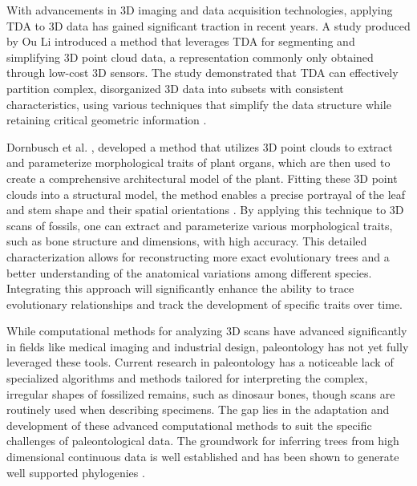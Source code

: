 \documentclass[12pt]{article}
\begin{document}

With advancements in 3D imaging and data acquisition technologies, applying TDA 
to 3D data has gained significant traction in recent years. A study produced by 
Ou Li \citep{li2021} introduced a method that leverages TDA for segmenting and 
simplifying 3D point cloud data, a representation commonly only obtained through 
low-cost 3D sensors. The study demonstrated that TDA can effectively partition 
complex, disorganized 3D data into subsets with consistent characteristics, 
using various techniques that simplify the data structure while retaining 
critical geometric information \citep{li2021}.

Dornbusch et al. \cite{dornbusch2007}, developed a method that utilizes 3D point 
clouds to extract and parameterize morphological traits of plant organs, which 
are then used to create a comprehensive architectural model of the plant. Fitting 
these 3D point clouds into a structural model, the method enables a precise 
portrayal of the leaf and stem shape and their spatial orientations \citep{dornbusch2007}. 
By applying this technique to 3D scans of fossils, one can extract and parameterize 
various morphological traits, such as bone structure and dimensions, with high 
accuracy. This detailed characterization allows for reconstructing more exact
evolutionary trees and a better understanding of the anatomical variations among
different species. Integrating this approach will significantly enhance the
ability to trace evolutionary relationships and track the development of
specific traits over time. 

While computational methods for analyzing 3D scans have advanced significantly
in fields like medical imaging and industrial design, paleontology has not yet
fully leveraged these tools. Current research in paleontology has a noticeable lack of
specialized algorithms and methods tailored for interpreting the complex,
irregular shapes of fossilized remains, such as dinosaur bones, though scans are
routinely used when describing specimens. The gap lies in
the adaptation and development of these advanced computational methods to suit
the specific challenges of paleontological data. The groundwork for inferring
trees from high dimensional continuous data is well established and has been
shown to generate well supported phylogenies \cite{gonzalez2008}.
\end{document}
